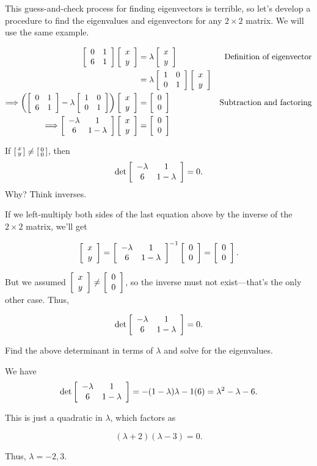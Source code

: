 \documentclass[../key.tex]{subfiles}
\begin{document}
\begin{outer_problem}
\item This guess-and-check process for finding eigenvectors is terrible, so let's develop a procedure to find the eigenvalues and eigenvectors for any $2\times 2$ matrix. We will use the same example.

\begin{align*}
\twomat{0}{1}{6}{1}\twovec{x}{y} &= \lambda\twovec{x}{y} & \text{Definition of eigenvector} \\
&= \lambda\twomat{1}{0}{0}{1}\twovec{x}{y} \\
\Longrightarrow \left(\twomat{0}{1}{6}{1}-\lambda\twomat{1}{0}{0}{1}\right)\twovec{x}{y}&=\twovec{0}{0} & \text{Subtraction and factoring} \\
\Longrightarrow \twomat{-\lambda}{1}{6}{1-\lambda}\twovec{x}{y} &= \twovec{0}{0}
\end{align*}
\end{outer_problem}

\begin{inner_problem}[start=1]
\item If $\stwovec{x}{y}\neq \stwovec{0}{0}$, then $$\det \twomat{-\lambda}{1}{6}{1-\lambda}=0.$$ Why? Think inverses.
\end{inner_problem}

If we left-multiply both sides of the last equation above by the inverse of the $2\times 2$ matrix, we'll get

$$\twovec{x}{y} = \twomat{-\lambda}{1}{6}{1-\lambda}^{-1}\twovec{0}{0} = \twovec{0}{0}.$$

But we assumed $\twovec{x}{y} \neq \twovec{0}{0}$, so the inverse must not exist---that's the only other case. Thus,

$$\det \twomat{-\lambda}{1}{6}{1-\lambda}=0.$$

\begin{inner_problem}
\item Find the above determinant in terms of $\lambda$ and solve for the eigenvalues.
\end{inner_problem}

We have $$\det \twomat{-\lambda}{1}{6}{1-\lambda}=-(1-\lambda)\lambda-1(6)=\lambda^2 - \lambda - 6.$$

This is just a quadratic in $\lambda$, which factors as

$$(\lambda + 2)(\lambda - 3) = 0.$$

Thus, $\lambda = -2,3$.
\end{document}
